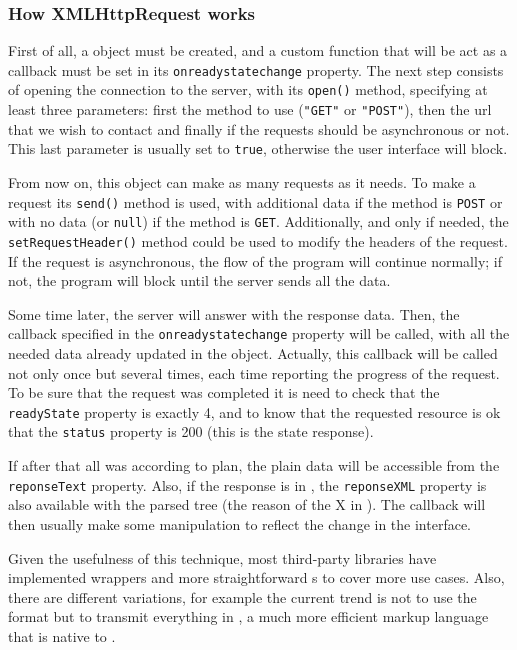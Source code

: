 \subsubsection{How XMLHttpRequest works} %
\label{ssub:xmlhttprequest}

First of all, a  object must be created, and a custom function that will be act as a callback must be set in its \texttt{onreadystatechange} property.
The next step consists of opening the connection to the server, with its \texttt{open()} method, specifying at least three parameters: first the  method to use (\texttt{"GET"} or \texttt{"POST"}), then the url that we wish to contact and finally if the requests should be asynchronous or not.
This last parameter is usually set to \texttt{true}, otherwise the user interface will block.

From now on, this object can make as many requests as it needs.
To make a request its \texttt{send()} method is used, with additional data if the method is \texttt{POST} or with no data (or \texttt{null}) if the method is \texttt{GET}.
Additionally, and only if needed, the \texttt{setRequestHeader()} method could be used to modify the headers of the  request.
If the request is asynchronous, the flow of the program will continue normally; if not, the program will block until the server sends all the data.

Some time later, the server will answer with the response data.
Then, the callback specified in the \texttt{onreadystatechange} property will be called, with all the needed data already updated in the  object.
Actually, this callback will be called not only once but several times, each time reporting the progress of the request.
To be sure that the request was completed it is need to check that the \texttt{readyState} property is exactly 4, and to know that the requested resource is ok that the \texttt{status} property is 200 (this is the  state response).

If after that all was according to plan, the plain data will be accessible from the \texttt{reponseText} property.
Also, if the response is in , the \texttt{reponseXML} property is also available with the parsed  tree (the reason of the X in ).
The callback will then usually make some  manipulation to reflect the change in the interface.

Given the usefulness of this technique, most third-party libraries have implemented wrappers and more straightforward s to cover more use cases.
Also, there are different variations, for example the current trend is not to use the  format but to transmit everything in , a much more efficient markup language that is native to .

